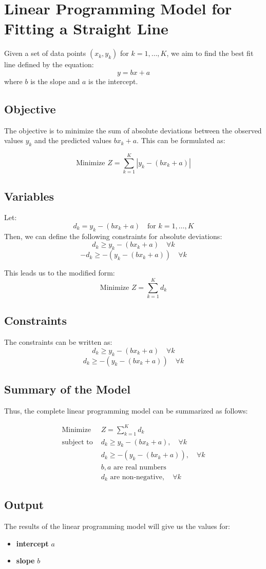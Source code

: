 \documentclass{article}
\begin{document}
\section*{Linear Programming Model for Fitting a Straight Line}

Given a set of data points \((x_k, y_k)\) for \(k = 1, \ldots, K\), we aim to find the best fit line defined by the equation:
\[
y = bx + a
\]
where \(b\) is the slope and \(a\) is the intercept.

\subsection*{Objective}
The objective is to minimize the sum of absolute deviations between the observed values \(y_k\) and the predicted values \(bx_k + a\). This can be formulated as:

\[
\text{Minimize } Z = \sum_{k=1}^{K} |y_k - (bx_k + a)|
\]

\subsection*{Variables}
Let:
\[
d_k = y_k - (bx_k + a) \quad \text{for } k = 1, \ldots, K
\]
Then, we can define the following constraints for absolute deviations:
\[
d_k \geq y_k - (bx_k + a) \quad \forall k
\]
\[
-d_k \geq -(y_k - (bx_k + a)) \quad \forall k
\]

This leads us to the modified form:
\[
\text{Minimize } Z = \sum_{k=1}^{K} d_k
\]

\subsection*{Constraints}
The constraints can be written as:
\[
d_k \geq y_k - (bx_k + a) \quad \forall k
\]
\[
d_k \geq -(y_k - (bx_k + a)) \quad \forall k
\]

\subsection*{Summary of the Model}
Thus, the complete linear programming model can be summarized as follows:

\begin{align*}
\text{Minimize } & Z = \sum_{k=1}^{K} d_k \\
\text{subject to } & d_k \geq y_k - (bx_k + a), \quad \forall k \\
                   & d_k \geq -(y_k - (bx_k + a)), \quad \forall k \\
                   & b, a \text{ are real numbers} \\
                   & d_k \text{ are non-negative}, \quad \forall k
\end{align*}

\subsection*{Output}
The results of the linear programming model will give us the values for:
\begin{itemize}
    \item \textbf{intercept} \(a\)
    \item \textbf{slope} \(b\)
\end{itemize}
\end{document}
